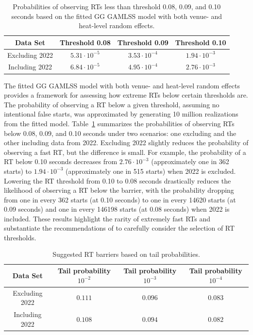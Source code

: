 \documentclass[12pt, letterpaper]{article}
\begin{document}
\begin{table}
  \centering
  \caption{Probabilities of observing RTs less than threshold 0.08,
  0.09, and 0.10 seconds based on the
    fitted GG GAMLSS model with both venue- and heat-level
random effects.}
  \begin{tabular}{c c c c}
   \toprule
   Data Set & Threshold 0.08 & Threshold 0.09 & Threshold 0.10  \\
   \midrule
   Excluding 2022 & $5.31\cdot10^{-5}$ & $3.53\cdot10^{-4}$ &  $1.94\cdot10^{-3}$  \\
   Including 2022 & $6.84\cdot10^{-5}$ & $4.95\cdot10^{-4}$ & $2.76\cdot10^{-3}$ \\
   \bottomrule
  \end{tabular}
  \label{tab:Sim_probability}
\end{table}


The fitted GG GAMLSS model with both venue- and heat-level
random effects provides a framework for assessing how extreme RTs
below certain thresholds are. The probability of observing a RT
below a given threshold, assuming no intentional false starts, was approximated
by generating 10 million realizations from the fitted model.
Table~\ref{tab:Sim_probability} summarizes the probabilities of observing
RTs below 0.08, 0.09, and 0.10 seconds under two scenarios: one
excluding and the other including data from 2022. Excluding 2022 slightly
reduces the probability of observing a fast RT, but the difference
is small. For example, the probability of a RT below 0.10 seconds
decreases from $2.76 \cdot 10^{-3}$ (approximately one in 362 starts) to
$1.94 \cdot 10^{-3}$ (approximately one in 515 starts) when 2022 is excluded.
Lowering the RT threshold from 0.10 to 0.08 seconds drastically
reduces the likelihood of observing a RT below the barrier, with
the probability dropping from one in every 362 starts (at 0.10 seconds) to one
in every 14620 starts (at 0.09 seconds) and one in every 146198 starts (at 0.08
seconds) when 2022 is included. These results highlight the rarity of extremely
fast RTs and substantiate the recommendations of \citet{komi2009iaaf}
to carefully consider the selection of RT thresholds.


\begin{table}
  \centering
  \caption{Suggested RT barriers based on tail probabilities.}
  \begin{tabular}{c c c c}
   \toprule
   Data Set & Tail probability  $10^{-2}$ & Tail probability  $10^{-3}$ & Tail probability $10^{-4}$ \\
   \midrule
   Excluding 2022 & $0.111$ & $0.096$ & $0.083$ \\
   Including 2022 & $0.108$ & $0.094$ & $0.082$ \\
   \bottomrule
  \end{tabular}
  \label{tab:Sim_time}
\end{table}
\end{document}
